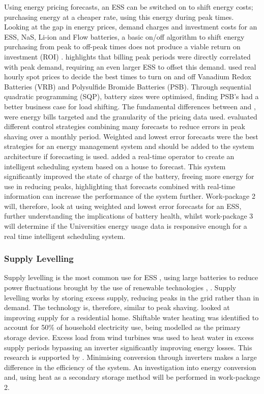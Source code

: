 Using energy pricing forecasts, an ESS can be switched on to shift
energy costs; purchasing energy at a cheaper rate, using this energy
during peak times. Looking at the gap in energy prices, demand charges
and investment costs for an ESS, NaS, Li-ion and Flow batteries, a basic
on/off algorithm to shift energy purchasing from peak to off-peak times
does not produce a viable return on investment (ROI) \cite{7555795}.
\cite{7555793} highlights that billing peak periods were directly
correlated with peak demand, requiring an even larger ESS to offset this
demand. \cite{5590194} used real hourly spot prices to decide the best
times to turn on and off Vanadium Redox Batteries (VRB) and Polysulfide
Bromide Batteries (PSB). Through sequential quadratic programming (SQP),
battery sizes were optimised, finding PSB's had a better business case
for load shifting. The fundamental differences between \cite{7555795}
and \cite{5590194}, were energy bills targeted and the granularity of
the pricing data used. \cite{6938948} evaluated different control
strategies combining many forecasts to reduce errors in peak shaving
over a monthly period. Weighted and lowest error forecasts were the best
strategies for an energy management system and should be added to the
system architecture if forecasting is used. \cite{Bennett2015122} added
a real-time operator to create an intelligent scheduling system based on
a house to forecast. This system significantly improved the state of
charge of the battery, freeing more energy for use in reducing peaks,
highlighting that forecasts combined with real-time information can
increase the performance of the system further. Work-package 2 will,
therefore, look at using weighted and lowest error forecasts for an ESS,
further understanding the implications of battery health, whilst
work-package 3 will determine if the Universities energy usage data is
responsive enough for a real time intelligent scheduling system.

\subsubsection{Supply Levelling}\label{supply-levelling}

Supply levelling is the most common use for ESS \cite{iearoadmapes},
using large batteries to reduce power fluctuations brought by the use of
renewable technologies \cite{7324861}, \cite{7564619}. Supply levelling
works by storing excess supply, reducing peaks in the grid rather than
in demand. The technology is, therefore, similar to peak shaving.
\cite{Allik20161116} looked at improving supply for a residential home.
Shiftable water heating was identified to account for 50\% of household
electricity use, being modelled as the primary storage device. Excess
load from wind turbines was used to heat water in excess supply periods
bypassing an inverter significantly improving energy losses. This
research is supported by \cite{Leadbetter2012685}. Minimising conversion
through inverters makes a large difference in the efficiency of the
system. An investigation into energy conversion and, using heat as a
secondary storage method will be performed in work-package 2.

